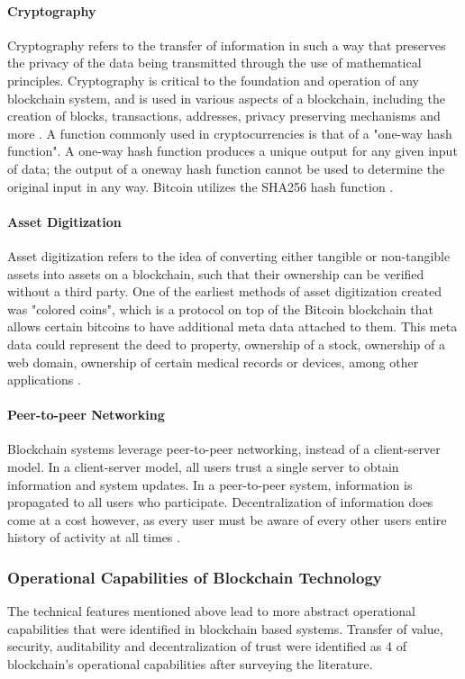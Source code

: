 \documentclass[12pt]{report}
\begin{document}
\paragraph{Cryptography}
Cryptography refers to the transfer of information in such a way that preserves the privacy of the data being transmitted through the use of mathematical principles. Cryptography is critical to the foundation and operation of any blockchain system, and is used in various aspects of a blockchain, including the creation of blocks, transactions, addresses, privacy preserving mechanisms and more \cite{Rosic.2017}. A function commonly used in cryptocurrencies is that of a "one-way hash function". A one-way hash function produces a unique output for any given input of data; the output of a oneway hash function cannot be used to determine the original input in any way. Bitcoin utilizes the SHA256 hash function \cite{.2016b}.

\paragraph{Asset Digitization}
\label{sec:dig}
Asset digitization refers to the idea of converting either tangible or non-tangible assets into assets on a blockchain, such that their ownership can be verified without a third party. One of the earliest methods of asset digitization created was "colored coins", which is a protocol on top of the Bitcoin blockchain that allows certain bitcoins to have additional meta data attached to them. This meta data could represent the deed to property, ownership of a stock, ownership of a web domain, ownership of certain medical records or devices, among other applications \cite{Rosenfeld.2012}.

\paragraph{Peer-to-peer Networking}
Blockchain systems leverage peer-to-peer networking, instead of a client-server model. In a client-server model, all users trust a single server to obtain information and system updates. In a peer-to-peer system, information is propagated to all users who participate. Decentralization of information does come at a cost however, as every user must be aware of every other users entire history of activity at all times \cite{Decker.2013}.

\subsubsection{Operational Capabilities of Blockchain Technology}
The technical features mentioned above lead to more abstract operational capabilities that were identified in blockchain based systems. Transfer of value, security, auditability and decentralization of trust were identified as 4 of blockchain's operational capabilities after surveying the literature. 
\end{document}

